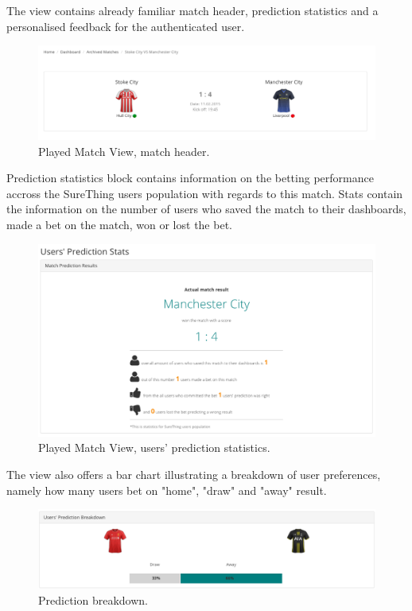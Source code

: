 The view contains already familiar match header, prediction statistics and a personalised feedback for the authenticated user. 

\begin{figure}[H]
	\begin{center}
		\includegraphics[width=.90\textwidth]{impl/images/matchHeader}
		\caption{Played Match View, match header.} \label{fig:matchheader}
	\end{center}
\end{figure}

Prediction statistics block contains information on the betting performance accross the SureThing users population with regards to this match. Stats contain the information on the number of users who saved the match to their dashboards, made a bet on the match, won or lost the bet. 

\begin{figure}[H]
	\begin{center}
		\includegraphics[width=.90\textwidth]{impl/images/predictionStats}
		\caption{Played Match View, users' prediction statistics.} \label{fig:predictionStats}
	\end{center}
\end{figure}

The view also offers a bar chart illustrating a breakdown of user preferences, namely how many users bet on "home", "draw" and "away" result.

\begin{figure}[H]
	\begin{center}
		\includegraphics[width=.90\textwidth]{impl/images/predictionBreakdown}
		\caption{Prediction breakdown.} \label{fig:predictionBreakdown}
	\end{center}
\end{figure}


